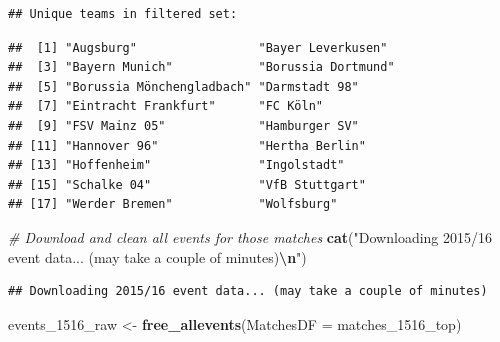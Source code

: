 \documentclass[
]{article}
\newenvironment{Shaded}{\begin{snugshade}}{\end{snugshade}}
\newcommand{\AttributeTok}[1]{\textcolor[rgb]{0.13,0.29,0.53}{#1}}
\newcommand{\CommentTok}[1]{\textcolor[rgb]{0.56,0.35,0.01}{\textit{#1}}}
\newcommand{\FunctionTok}[1]{\textcolor[rgb]{0.13,0.29,0.53}{\textbf{#1}}}
\newcommand{\NormalTok}[1]{#1}
\newcommand{\OtherTok}[1]{\textcolor[rgb]{0.56,0.35,0.01}{#1}}
\newcommand{\SpecialCharTok}[1]{\textcolor[rgb]{0.81,0.36,0.00}{\textbf{#1}}}
\newcommand{\StringTok}[1]{\textcolor[rgb]{0.31,0.60,0.02}{#1}}
\begin{document}
\begin{verbatim}
## Unique teams in filtered set:
\end{verbatim}

\begin{Shaded}
\end{Shaded}

\begin{verbatim}
##  [1] "Augsburg"                 "Bayer Leverkusen"        
##  [3] "Bayern Munich"            "Borussia Dortmund"       
##  [5] "Borussia Mönchengladbach" "Darmstadt 98"            
##  [7] "Eintracht Frankfurt"      "FC Köln"                 
##  [9] "FSV Mainz 05"             "Hamburger SV"            
## [11] "Hannover 96"              "Hertha Berlin"           
## [13] "Hoffenheim"               "Ingolstadt"              
## [15] "Schalke 04"               "VfB Stuttgart"           
## [17] "Werder Bremen"            "Wolfsburg"
\end{verbatim}

\begin{Shaded}
\begin{Highlighting}[]
\CommentTok{\# Download and clean all events for those matches}
\FunctionTok{cat}\NormalTok{(}\StringTok{"Downloading 2015/16 event data... (may take a couple of minutes)}\SpecialCharTok{\textbackslash{}n}\StringTok{"}\NormalTok{)}
\end{Highlighting}
\end{Shaded}

\begin{verbatim}
## Downloading 2015/16 event data... (may take a couple of minutes)
\end{verbatim}

\begin{Shaded}
\begin{Highlighting}[]
\NormalTok{events\_1516\_raw }\OtherTok{\textless{}{-}} \FunctionTok{free\_allevents}\NormalTok{(}\AttributeTok{MatchesDF =}\NormalTok{ matches\_1516\_top)}
\end{Highlighting}
\end{Shaded}
\end{document}
